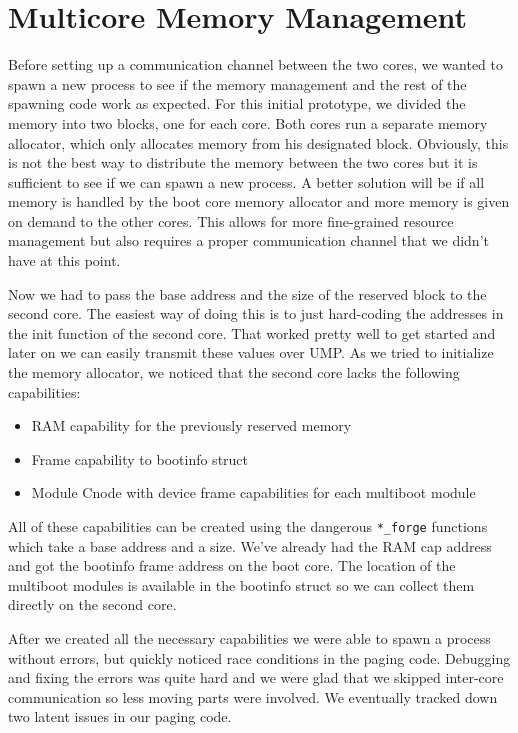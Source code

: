 \section{Multicore Memory Management}

Before setting up a communication channel between the two cores, we wanted to spawn a new process to see if the 
memory management and the rest of the spawning code work as expected. For this initial prototype, we divided 
the memory into two blocks, one for each core. Both cores run a separate memory allocator, which only allocates 
memory from his designated block. Obviously, this is not the best way to distribute the memory between the two 
cores but it is sufficient to see if we can spawn a new process. A better solution will be if all memory is 
handled by the boot core memory allocator and more memory is given on demand to the other cores. This allows 
for more fine-grained resource management but also requires a proper communication channel that we didn't have 
at this point.

Now we had to pass the base address and the size of the reserved block to the second core. The easiest way of 
doing this is to just hard-coding the addresses in the init function of the second core. That worked pretty well 
to get started and later on we can easily transmit these values over UMP. As we tried to initialize the memory 
allocator, we noticed that the second core lacks the following capabilities: 
\begin{itemize}
    \item RAM capability for the previously reserved memory
    \item Frame capability to bootinfo struct
    \item Module Cnode with device frame capabilities for each multiboot module
\end{itemize}
All of these capabilities can be created using the dangerous \verb|*_forge| functions which take a base address 
and a size. We've already had the RAM cap address and got the bootinfo frame address on the boot core. The 
location of the multiboot modules is available in the bootinfo struct so we can collect them directly on the 
second core.

After we created all the necessary capabilities we were able to spawn a process without errors, but quickly 
noticed race conditions in the paging code. Debugging and fixing the errors was quite hard and we were glad that 
we skipped inter-core communication so less moving parts were involved. We eventually tracked down two latent 
issues in our paging code.

